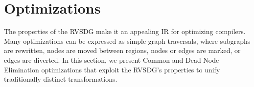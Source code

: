 \section{Optimizations}\label{sec:optimizations}
The properties of the RVSDG make it an appealing IR for optimizing compilers. Many optimizations
can be expressed as simple graph traversals, where subgraphs are rewritten, nodes are moved between
regions, nodes or edges are marked, or edges are diverted. In this section, we present Common and
Dead Node Elimination optimizations that exploit the RVSDG's properties to unify traditionally
distinct transformations.




